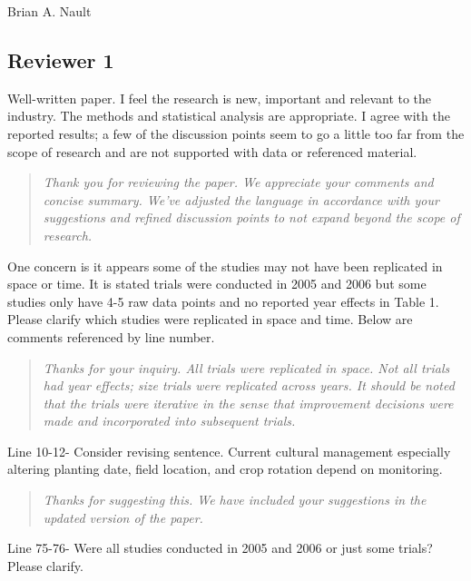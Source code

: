 \documentclass{article}
\begin{document}
Brian A. Nault
\vspace{0.48em} 


\vspace{1.4em}

\hline

\setlength\parindent{0pt}

\subsection*{Reviewer 1}

Well-written paper.  I feel the research is new, important and relevant to the industry.  The methods and statistical analysis are appropriate.  I agree with the reported results; a few of the discussion points seem to go a little too far from the scope of research and are not supported with data or referenced material.   

\begin{quote}
    \textit{Thank you for reviewing the paper.  We appreciate your comments and concise summary.  We've adjusted the language in accordance with your suggestions and refined discussion points to not expand beyond the scope of research.  }
\end{quote}

One concern is it appears some of the studies may not have been replicated in space or time.  It is stated trials were conducted in 2005 and 2006 but some studies only have 4-5 raw data points and no reported year effects in Table 1.  Please clarify which studies were replicated in space and time.   Below are comments referenced by line number.

\begin{quote}
    \textit{Thanks for your inquiry.  All trials were replicated in space.  Not all trials had year effects; size trials were replicated across years.  It should be noted that the trials were iterative in the sense that improvement decisions were made and incorporated into subsequent trials.  }
\end{quote}


Line 10-12- Consider revising sentence.  Current cultural management especially altering planting date, field location, and crop rotation depend on monitoring.

\begin{quote}
    \textit{Thanks for suggesting this.  We have included your suggestions in the updated version of the paper.  }
\end{quote}

Line 75-76- Were all studies conducted in 2005 and 2006 or just some trials? Please clarify.
\end{document}
